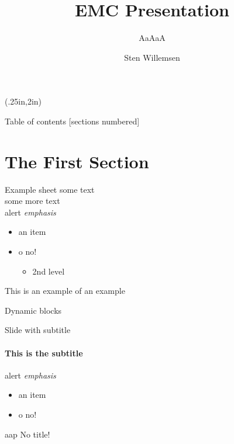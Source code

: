 \documentclass[12pt, dutch]{beamer}
\author{Sten Willemsen}
\title{EMC Presentation}
\subtitle{AaAaA}
\begin{document}
\begin{frame}
	\titlepage
\begin{textblock*}{\textwidth}(.25in,2in)
\end{textblock*} 
\end{frame}


\begin{frame}{Table of contents}
  [sections numbered]
  \tableofcontents[hideallsubsections]
\end{frame}

\section{The First Section}

\begin{frame}{Example sheet}
some text \\
some more text \\
\alert{alert} 
\emph{emphasis}
\begin{itemize}
\item an item
\item o \alert{no}!
\begin{itemize}
\item 2nd level
\end{itemize}
\end{itemize}
\begin{example}[An example]
This is an example of an example
\end{example}
\end{frame}

\begin{frame}{Dynamic blocks}
\begin{dynblock}
\end{dynblock}
\end{frame}

\begin{frame}{Slide with subtitle}
    \framesubtitle{This is the subtitle}

\alert{alert} 
\emph{emphasis}
\begin{itemize}
\item an item
\item o \alert{no}!
\end{itemize}
    \begin{blocknotitle}{aap}
         No title!
      \end{blocknotitle}

\end{frame}
\end{document}
